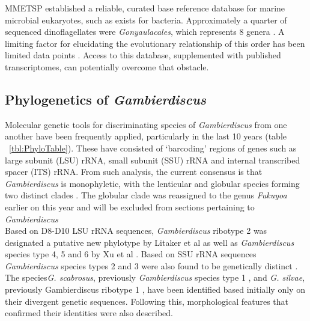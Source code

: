 \documentclass[12pt]{article}
\begin{document}
MMETSP established a reliable, curated base reference database for marine microbial eukaryotes, such as exists for bacteria. Approximately a quarter of sequenced dinoflagellates were \emph{Gonyaulacales}, which represents 8 genera \cite{keeling2014marine}. A limiting factor for elucidating the evolutionary relationship of this order has been limited data points \cite{bachvaroff2014dinoflagellate,gentekaki2014large,orr2012naked}. Access to this database, supplemented with published transcriptomes, can potentially overcome that obstacle. \\ 


\subsection{Phylogenetics of \emph{Gambierdiscus}}

Molecular genetic tools for discriminating species of \emph{Gambierdiscus} from one another have been frequently applied, particularly in the last 10 years (table ~\ref{tbl:PhyloTable}). These have consisted of ‘barcoding’ regions of genes such as large subunit (LSU) rRNA, small subunit (SSU) rRNA and internal transcribed spacer (ITS) rRNA. From such analysis, the current consensus is that \emph{Gambierdiscus} is monophyletic, with the lenticular and globular species forming two distinct clades \cite{chinain1999morphology,litaker2009taxonomy,fraga2011gambierdiscus,richlen2008phylogeography,kuno2010genetic,litaker2010global,nishimura2013genetic}. The globular clade was reassigned to the genus \emph{Fukuyoa} earlier on this year \cite{gomez2015fukuyoa} and will be excluded from sections pertaining to \emph{Gambierdiscus}\\


Based on D8-D10 LSU rRNA sequences, \emph{Gambierdiscus} ribotype 2 was designated a putative new phylotype by Litaker et al \cite{litaker2010global} as well as \emph{Gambierdiscus} species type 4, 5 and 6 by Xu et al \cite{xu2014distribution}. Based on SSU rRNA sequences \emph{Gambierdiscus} species types 2 and 3 were also found to be genetically distinct \cite{nishimura2013genetic,kuno2010genetic}. The species\emph{G. scabrosus}, previously \emph{Gambierdiscus} species type 1 \cite{nishimura2013genetic,nishimura2014morphology},  and \emph{G. silvae}, previously Gambierdiscus ribotype 1 \cite{fraga2014genus}, have been identified based initially only on their divergent genetic sequences. Following this, morphological features that confirmed their identities were also described. \\
\end{document}
